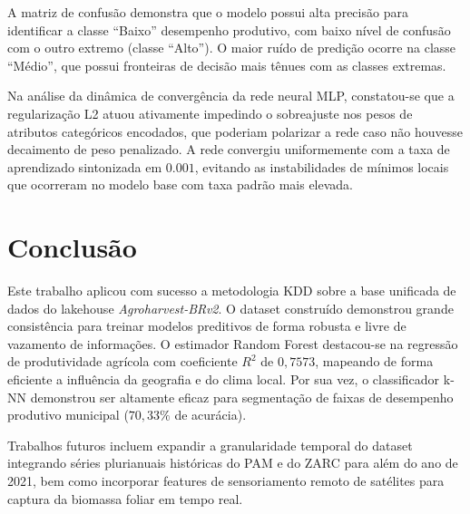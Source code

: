 \documentclass[conference]{IEEEtran}
\begin{document}
A matriz de confusão demonstra que o modelo possui alta precisão para identificar a classe ``Baixo'' desempenho produtivo, com baixo nível de confusão com o outro extremo (classe ``Alto''). O maior ruído de predição ocorre na classe ``Médio'', que possui fronteiras de decisão mais tênues com as classes extremas.

Na análise da dinâmica de convergência da rede neural MLP, constatou-se que a regularização L2 atuou ativamente impedindo o sobreajuste nos pesos de atributos categóricos encodados, que poderiam polarizar a rede caso não houvesse decaimento de peso penalizado. A rede convergiu uniformemente com a taxa de aprendizado sintonizada em $0.001$, evitando as instabilidades de mínimos locais que ocorreram no modelo base com taxa padrão mais elevada.

\section{Conclusão}
Este trabalho aplicou com sucesso a metodologia KDD sobre a base unificada de dados do lakehouse \textit{Agroharvest-BRv2}. O dataset construído demonstrou grande consistência para treinar modelos preditivos de forma robusta e livre de vazamento de informações. O estimador Random Forest destacou-se na regressão de produtividade agrícola com coeficiente $R^2$ de $0{,}7573$, mapeando de forma eficiente a influência da geografia e do clima local. Por sua vez, o classificador k-NN demonstrou ser altamente eficaz para segmentação de faixas de desempenho produtivo municipal ($70{,}33\%$ de acurácia). 

Trabalhos futuros incluem expandir a granularidade temporal do dataset integrando séries plurianuais históricas do PAM e do ZARC para além do ano de 2021, bem como incorporar features de sensoriamento remoto de satélites para captura da biomassa foliar em tempo real.
\end{document}
